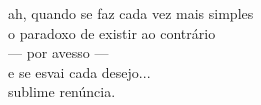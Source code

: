 ah, quando se faz cada vez mais simples\\
o paradoxo de existir ao contrário\\
--- por avesso ---\\
e se esvai cada desejo...\\
sublime renúncia.

